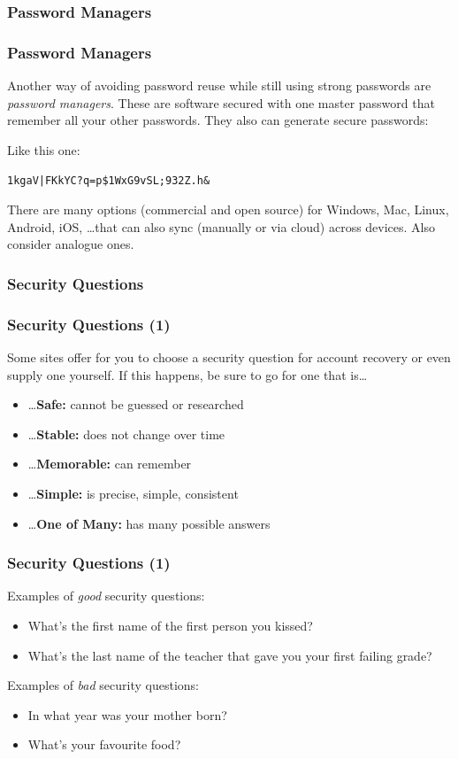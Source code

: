 \documentclass[aspectratio=1610,dvipsnames]{beamer}
\begin{document}
\subsubsection{Password Managers}

\begin{frame}
\frametitle{Password Managers}
Another way of avoiding password reuse while still using strong passwords are \emph{password managers}. These are software secured with one master password that remember all your other passwords. They also can generate secure passwords:
\pause\bigskip

Like this one:
\begin{center}
\texttt{1kgaV|FKkYC?q=p\$1WxG9vSL;932Z.h\&}
\end{center}
\pause\bigskip

There are many options (commercial and open source) for Windows, Mac, Linux, Android, iOS, \dots that can also sync (manually or via cloud) across devices. Also consider analogue ones.
\end{frame}

\subsubsection{Security Questions}

\begin{frame}
\frametitle{Security Questions (1)}

Some sites offer for you to choose a security question for account recovery or even supply one yourself. If this happens, be sure to go for one that is\dots
\bigskip

\begin{itemize}
\pause\item\dots \textbf{Safe:} cannot be guessed or researched
\pause\item\dots \textbf{Stable:} does not change over time
\pause\item\dots \textbf{Memorable:} can remember
\pause\item\dots \textbf{Simple:} is precise, simple, consistent
\pause\item\dots \textbf{One of Many:} has many possible answers
\end{itemize}
\end{frame}

\begin{frame}
\frametitle{Security Questions (1)}
Examples of \emph{good} security questions:
\medskip
\begin{itemize}
\item What's the first name of the first person you kissed?
\item What's the last name of the teacher that gave you your first failing grade?
\end{itemize}
\bigskip

Examples of \emph{bad} security questions:
\begin{itemize}
\item In what year was your mother born?
\item What's your favourite food?
\end{itemize}
\end{frame}
\end{document}
